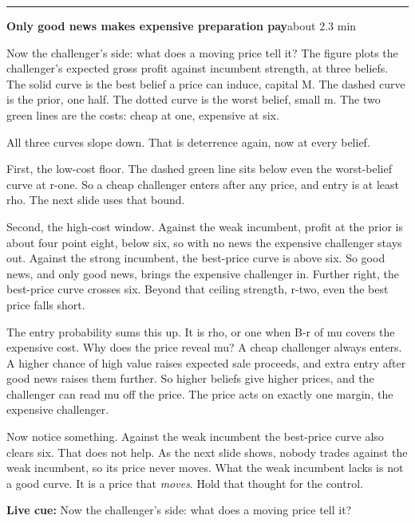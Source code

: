 \documentclass[11pt]{article}
\newcommand{\Cue}[1]{\par\nobreak\smallskip\noindent
  \textcolor{ScriptGray}{\footnotesize\textbf{Live cue:} #1}\par}
\newcommand{\scriptframe}[3]{%
  \Needspace{9\baselineskip}%
  \par\medskip\noindent\textcolor{ScriptBlue}{\rule{\linewidth}{0.55pt}}%
  \par\smallskip\noindent
  \textbf{#1}\hfill\textcolor{ScriptGray}{\small #2}\par\smallskip
  #3\par}
\begin{document}
\scriptframe{Only good news makes expensive preparation pay}{about 2.3 min}{%
  Now the challenger's side: what does a moving price tell it? The figure plots
  the challenger's expected gross profit against incumbent strength, at three
  beliefs. The solid curve is the best belief a price can induce, capital M. The
  dashed curve is the prior, one half. The dotted curve is the worst belief,
  small m. The two green lines are the costs: cheap at one, expensive at six.

  All three curves slope down. That is deterrence again, now at every belief.

  First, the low-cost floor. The dashed green line sits below even the
  worst-belief curve at r-one. So a cheap challenger enters after any price,
  and entry is at least rho. The next slide uses that bound.

  Second, the high-cost window. Against the weak incumbent, profit at the prior
  is about four point eight, below six,
  so with no news the expensive challenger stays out. Against the strong
  incumbent, the best-price curve is above six. So good news, and only good
  news, brings the expensive challenger in. Further right, the best-price curve
  crosses six. Beyond that ceiling strength, r-two, even the best price falls
  short.

  The entry probability sums this up. It is rho, or one when B-r of mu covers
  the expensive cost. Why does the price reveal mu? A cheap challenger always
  enters. A higher chance of high value raises expected sale proceeds, and
  extra entry after good news raises them further. So higher beliefs give
  higher prices, and the challenger can read mu off the price. The price acts
  on exactly one margin, the expensive challenger.

  Now notice something. Against the weak incumbent the best-price curve also
  clears six. That does not help. As the next slide shows, nobody trades against
  the weak incumbent, so its price never moves. What the weak incumbent lacks is
  not a good curve. It is a price that \emph{moves}. Hold that thought for the
  control.
  \Cue{Now the challenger's side: what does a moving price tell it?}
}
\end{document}
